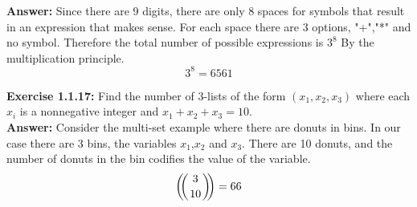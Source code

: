 \documentclass{amsart}
\def\multiset#1#2{\ensuremath{\left(\kern-.3em\left(\genfrac{}{}{0pt}{}{#1}{#2}\right)\kern-.3em\right)}}
\begin{document}
\noindent \textbf{Answer:}
Since there are 9 digits, there are only 8 spaces for symbols that result in an expression that makes sense. For each space there are 3 options, "+","*" and no symbol. Therefore the total number of possible expressions is $3^8$ By the multiplication principle.
\begin{equation}
3^8 = 6561
\end{equation}


\vspace{1in}

\noindent\textbf{Exercise 1.1.17: } Find the number of 3-lists of the form $(x_1,x_2,x_3)$ where each $x_i$ is a nonnegative integer and $x_1+x_2+x_3 =10.$\\

\noindent \textbf{Answer:}
Consider the multi-set example where there are donuts in bins. In our case there are 3 bins, the variables $x_1$,$x_2$ and $x_3$. There are 10 donuts, and the number of donuts in the bin codifies the value of the variable. 
\begin{equation}
\multiset{3}{10}=66
\end{equation}


\vspace{1in}
\end{document}
